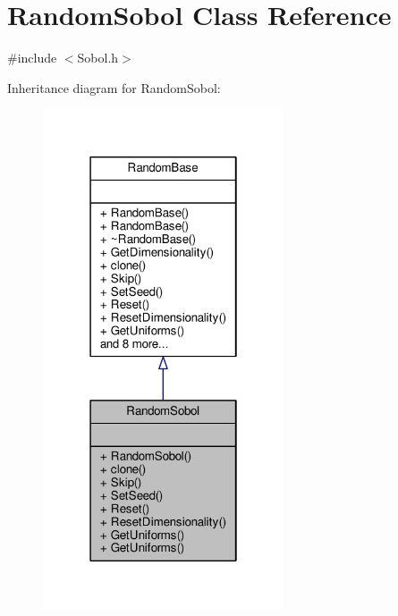 \hypertarget{classRandomSobol}{}\section{Random\+Sobol Class Reference}
\label{classRandomSobol}


{\ttfamily \#include $<$Sobol.\+h$>$}



Inheritance diagram for Random\+Sobol\+:
\nopagebreak
\begin{figure}[H]
\begin{center}
\leavevmode
\includegraphics[width=202pt]{classRandomSobol__inherit__graph}
\end{center}
\end{figure}


